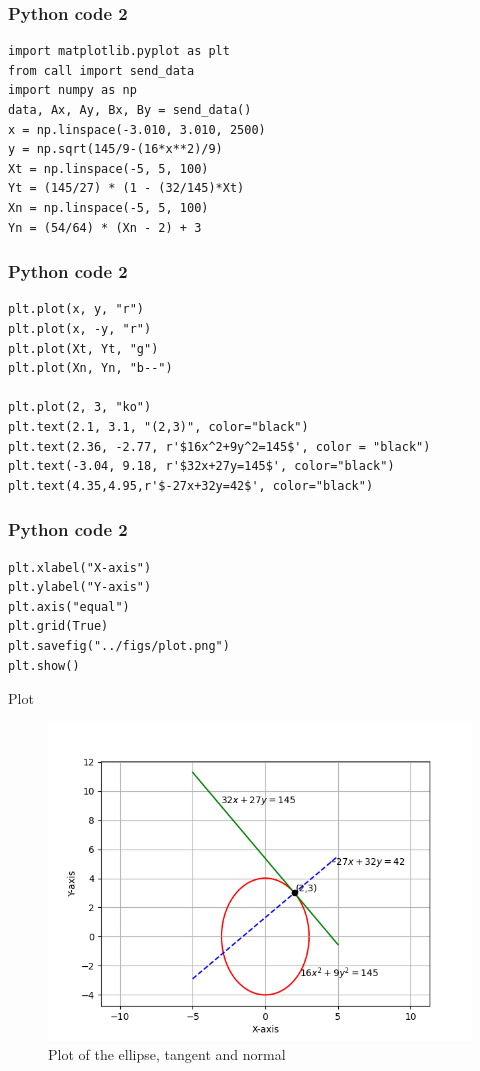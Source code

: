 \documentclass{beamer}
\begin{document}
\begin{frame}[fragile]
    \frametitle{Python code 2}
    \begin{lstlisting}
import matplotlib.pyplot as plt
from call import send_data
import numpy as np
data, Ax, Ay, Bx, By = send_data()
x = np.linspace(-3.010, 3.010, 2500)
y = np.sqrt(145/9-(16*x**2)/9)
Xt = np.linspace(-5, 5, 100)
Yt = (145/27) * (1 - (32/145)*Xt)
Xn = np.linspace(-5, 5, 100)
Yn = (54/64) * (Xn - 2) + 3
    \end{lstlisting}
\end{frame}

\begin{frame}[fragile]
    \frametitle{Python code 2}
    \begin{lstlisting}
plt.plot(x, y, "r")
plt.plot(x, -y, "r")
plt.plot(Xt, Yt, "g")
plt.plot(Xn, Yn, "b--")

plt.plot(2, 3, "ko")
plt.text(2.1, 3.1, "(2,3)", color="black")
plt.text(2.36, -2.77, r'$16x^2+9y^2=145$', color = "black")
plt.text(-3.04, 9.18, r'$32x+27y=145$', color="black")
plt.text(4.35,4.95,r'$-27x+32y=42$', color="black")
    \end{lstlisting}
\end{frame}

\begin{frame}[fragile]
    \frametitle{Python code 2}
    \begin{lstlisting}
plt.xlabel("X-axis")
plt.ylabel("Y-axis")
plt.axis("equal")
plt.grid(True)
plt.savefig("../figs/plot.png")
plt.show()
    \end{lstlisting}
\end{frame}

\begin{frame}{Plot}
    \begin{figure}
        \centering
        \includegraphics[width=0.5\columnwidth]{../figs/plot.png}
        \caption{Plot of the ellipse, tangent and normal}
        \label{fig:fig}
    \end{figure}
\end{frame}
\end{document}
